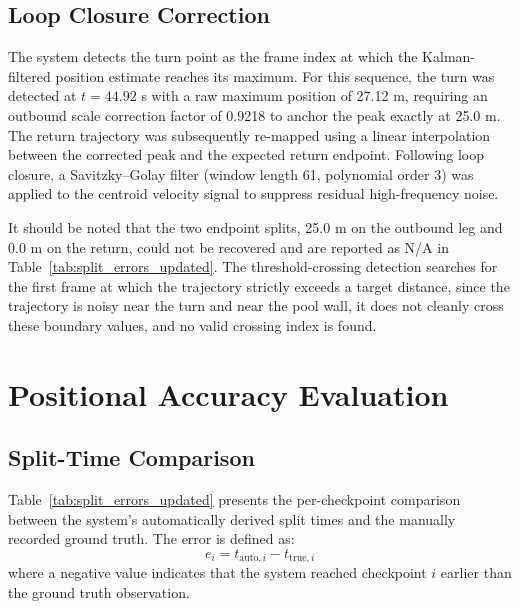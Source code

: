 \subsection{Loop Closure Correction}
The system detects the turn point as the frame index at which the Kalman-filtered position estimate reaches its maximum. For this sequence, the turn was detected at $t = 44.92$ s with a raw maximum position of 27.12 m, requiring an outbound scale correction factor of 0.9218 to anchor the peak exactly at 25.0 m. The return trajectory was subsequently re-mapped using a linear interpolation between the corrected peak and the expected return endpoint. Following loop closure, a Savitzky--Golay filter (window length 61, polynomial order 3) was applied to the centroid velocity signal to suppress residual high-frequency noise.

It should be noted that the two endpoint splits, 25.0 m on the outbound leg and 0.0 m on the return, could not be recovered and are reported as N/A in Table~\ref{tab:split_errors_updated}. The threshold-crossing detection searches for the first frame at which the trajectory strictly exceeds a target distance, since the trajectory is noisy near the turn and near the pool wall, it does not cleanly cross these boundary values, and no valid crossing index is found.

\section{Positional Accuracy Evaluation}

\subsection{Split-Time Comparison}
Table~\ref{tab:split_errors_updated} presents the per-checkpoint comparison between the system's automatically derived split times and the manually recorded ground truth. The error is defined as:
\begin{equation}
    e_i = t_{\text{auto},i} - t_{\text{true},i}
\end{equation}
where a negative value indicates that the system reached checkpoint $i$ earlier than the ground truth observation.

